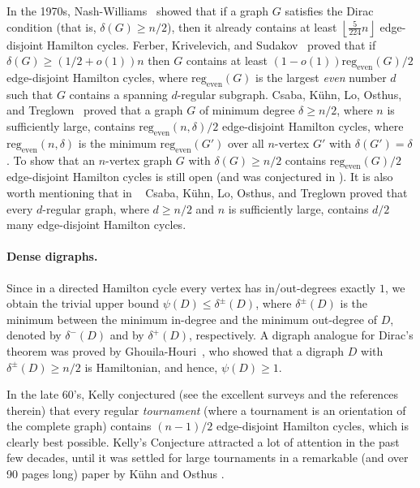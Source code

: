 \documentclass{article}
\begin{document}
	In the 1970s, Nash-Williams~\cite{nashwilliams} showed that if a graph $G$ satisfies the Dirac condition (that is, $\delta(G)\geq n/2$), then it already contains at least $\left\lfloor \frac{5}{224}n \right\rfloor$ edge-disjoint Hamilton cycles.
	Ferber, Krivelevich, and Sudakov~\cite{ferber2017counting} proved that if $\delta(G)\geq (1/2+o(1))n$ then $G$ contains at least $(1-o(1))\text{reg}_{\text{even}}(G)/2$ edge-disjoint Hamilton cycles, where $\text{reg}_{\text{even}}(G)$ is the largest \emph{even} number $d$ such that $G$ contains a spanning $d$-regular subgraph.
	Csaba, K\"{u}hn, Lo, Osthus, and Treglown~\cite{1factorization} proved that a graph $G$ of minimum degree $\delta \ge n/2$, where $n$ is sufficiently large, contains $\text{reg}_{\text{even}}(n, \delta)/2$ edge-disjoint Hamilton cycles, where $\text{reg}_{\text{even}}(n,\delta)$ is the minimum $\text{reg}_{\text{even}}(G')$ over all $n$-vertex $G'$ with $\delta(G') = \delta$. To show that an $n$-vertex graph $G$ with $\delta(G)\geq n/2$ contains $\text{reg}_{\text{even}}(G)/2$ edge-disjoint Hamilton cycles is still open (and was conjectured in \cite{kuhn2013hamilton}).
	It is also worth mentioning that in ~\cite{1factorization} Csaba, K\"{u}hn, Lo, Osthus, and Treglown proved that every $d$-regular graph, where $d\ge n/2$ and $n$ is sufficiently large, contains $d/2$ many edge-disjoint Hamilton cycles.
	
	
	
	\paragraph{Dense digraphs.}
	
	Since in a directed Hamilton cycle every vertex has in/out-degrees exactly $1$, we obtain the trivial upper bound $\psi(D)\leq \delta^{\pm}(D)$, where $\delta^{\pm}(D)$ is the minimum between the minimum in-degree and the minimum out-degree of $D$, denoted by $\delta^-(D)$ and by $\delta^+(D)$, respectively. A digraph analogue for Dirac's theorem was proved by Ghouila-Houri~\cite{ghouilahouri}, who showed that a digraph $D$ with $\delta^{\pm}(D)\geq n/2$ is Hamiltonian, and hence, $\psi(D)\geq 1$.
	
	In the late $60$'s, Kelly conjectured (see the excellent surveys \cites{kuhn2012survey,kuhn2014hamilton} and the references therein) that every regular \emph{tournament} (where a tournament is an orientation of the complete graph) contains $(n-1)/2$ edge-disjoint Hamilton cycles, which is clearly best possible.
	Kelly’s Conjecture attracted a lot of attention in the past few decades, until it was settled for large tournaments in a remarkable (and over 90 pages long) paper by K\"{u}hn and Osthus \cite{kuhn2013hamilton}.
	
\end{document}

